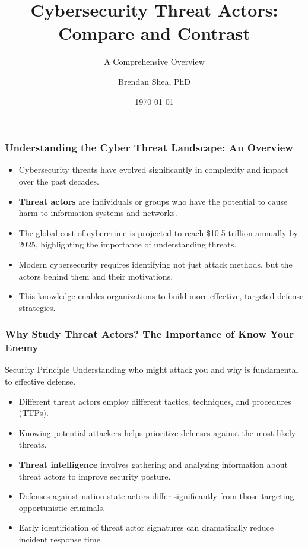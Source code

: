 \documentclass{beamer}
\title{Cybersecurity Threat Actors: Compare and Contrast}
\subtitle{A Comprehensive Overview}
\author{Brendan Shea, PhD}
\date{\today}
\begin{document}
\begin{frame}
    \titlepage
\end{frame}

\begin{frame}
    \frametitle{Understanding the Cyber Threat Landscape: An Overview}
    
    \begin{itemize}
        \item Cybersecurity threats have evolved significantly in complexity and impact over the past decades.
        \item \textbf{Threat actors} are individuals or groups who have the potential to cause harm to information systems and networks.
        \item The global cost of cybercrime is projected to reach \$10.5 trillion annually by 2025, highlighting the importance of understanding threats.
        \item Modern cybersecurity requires identifying not just attack methods, but the actors behind them and their motivations.
        \item This knowledge enables organizations to build more effective, targeted defense strategies.
    \end{itemize}
\end{frame}

\begin{frame}
    \frametitle{Why Study Threat Actors? The Importance of Know Your Enemy}
    
    \begin{alertblock}{Security Principle}
        Understanding who might attack you and why is fundamental to effective defense.
    \end{alertblock}
    
    \begin{itemize}
        \item Different threat actors employ different tactics, techniques, and procedures (TTPs).
        \item Knowing potential attackers helps prioritize defenses against the most likely threats.
        \item \textbf{Threat intelligence} involves gathering and analyzing information about threat actors to improve security posture.
        \item Defenses against nation-state actors differ significantly from those targeting opportunistic criminals.
        \item Early identification of threat actor signatures can dramatically reduce incident response time.
    \end{itemize}
\end{frame}
\end{document}
